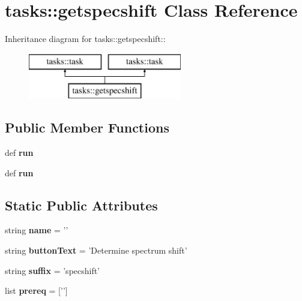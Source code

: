 \section{tasks::getspecshift Class Reference}
\label{classtasks_1_1getspecshift}
Inheritance diagram for tasks::getspecshift::\begin{figure}[H]
\begin{center}
\leavevmode
\includegraphics[height=2cm]{classtasks_1_1getspecshift}
\end{center}
\end{figure}
\subsection*{Public Member Functions}
\begin{CompactItemize}
\item 
def \textbf{run}\label{classtasks_1_1getspecshift_9d2c0ae4d503b9ace36fb95efb3c774a}

\item 
def \textbf{run}\label{classtasks_1_1getspecshift_9d2c0ae4d503b9ace36fb95efb3c774a}

\end{CompactItemize}
\subsection*{Static Public Attributes}
\begin{CompactItemize}
\item 
string \textbf{name} = '{\bfgetspecshift}'\label{classtasks_1_1getspecshift_1151b6e77da357b7a8b7ba64357f427c}

\item 
string \textbf{button\-Text} = 'Determine spectrum shift'\label{classtasks_1_1getspecshift_ff492a9ffb50fd1bb4e87dc95e789743}

\item 
string \textbf{suffix} = 'specshift'\label{classtasks_1_1getspecshift_c30c0182aa89a375061e301ffec5ad22}

\item 
list \textbf{prereq} = ['{\bfpreproc}']\label{classtasks_1_1getspecshift_ad17795867562b353e02ea4012a661c8}

\end{CompactItemize}


